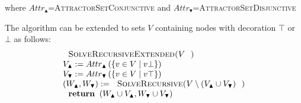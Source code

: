 where $Attr_{\blacktriangle }$=\textsc{AttractorSetConjunctive} and $%
Attr_{\blacktriangledown }$=\textsc{AttractorSetDisjunctive}

The algorithm can be extended to sets $V$ containing nodes with decoration $%
\top $ or $\bot $ as follows:%
\begin{equation*}
\begin{array}{l}
\text{\textsc{SolveRecursiveExtended(}}V\text{\textsc{)}} \\ 
V_{\blacktriangle }:=Attr_{\blacktriangle }\left( \{v\in V\mid v\bot
\}\right)  \\ 
V_{\blacktriangledown }:=Attr_{\blacktriangledown }\left( \{v\in V\mid v\top
\}\right)  \\ 
\left( W_{\blacktriangle },W_{\blacktriangledown }\right) :=\text{\textsc{%
SolveRecursive(}}V\setminus (V_{\blacktriangle }\cup V_{\blacktriangledown })%
\text{\textsc{)}} \\ 
\text{\textbf{return }}\left( W_{\blacktriangle }\cup V_{\blacktriangle
},W_{\blacktriangledown }\cup V_{\blacktriangledown }\right) 
\end{array}%
\end{equation*}%
\newpage 
